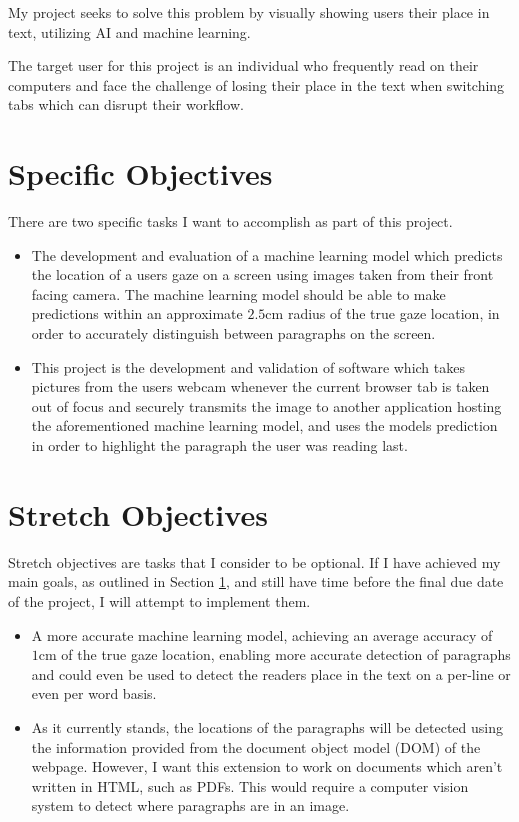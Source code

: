 \documentclass[twocolumn]{report}
\begin{document}
My project seeks to solve this problem by visually showing users their place in text, utilizing AI and machine learning. 

The target user for this project is an individual who frequently read on their computers and face the challenge of losing their place in the text when switching tabs which can disrupt their workflow. 

\section{Specific Objectives}\label{sec:specific-objectives}

There are two specific tasks I want to accomplish as part of this project. 

\begin{itemize}
    \item The development and evaluation of a machine learning model which predicts the location of a users gaze on a screen using images taken from their front facing camera. The machine learning model should be able to make predictions within an approximate $2.5\text{cm}$ radius of the true gaze location, in order to accurately distinguish between paragraphs on the screen. 
    \item This project is the development and validation of software which takes pictures from the users webcam whenever the current browser tab is taken out of focus and securely transmits the image to another application hosting the aforementioned machine learning model, and uses the models prediction in order to highlight the paragraph the user was reading last. 
\end{itemize}

\section{Stretch Objectives}

Stretch objectives are tasks that I consider to be optional. If I have achieved my main goals, as outlined in Section \ref{sec:specific-objectives}, and still have time before the final due date of the project, I will attempt to implement them. 

\begin{itemize}
    \item A more accurate machine learning model, achieving an average accuracy of $1\text{cm}$ of the true gaze location, enabling more accurate detection of paragraphs and could even be used to detect the readers place in the text on a per-line or even per word basis. 

    \item As it currently stands, the locations of the paragraphs will be detected using the information provided from the document object model (DOM) of the webpage. However, I want this extension to work on documents which aren't written in HTML, such as PDFs. This would require a computer vision system to detect where paragraphs are in an image. 

\end{itemize}
\end{document}
